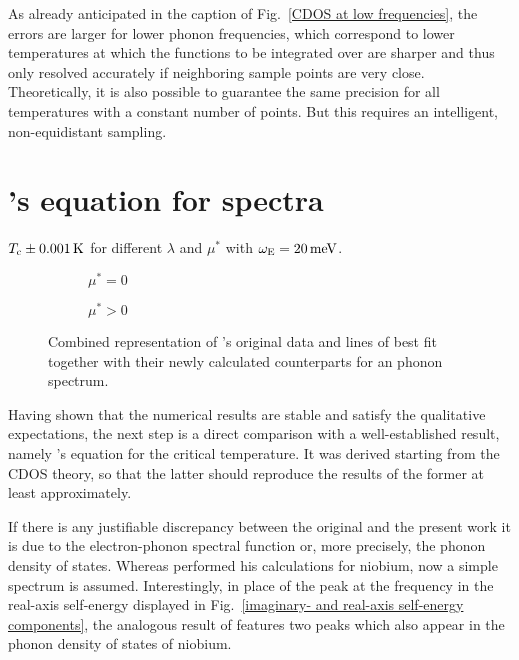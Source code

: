 As already anticipated in the caption of Fig.~\ref{CDOS at low frequencies}, the
errors are larger for lower phonon frequencies, which correspond to lower
temperatures at which the  functions to be integrated over are
sharper and thus only resolved accurately if neighboring sample points are very
close. Theoretically, it is also possible to guarantee the same precision for
all temperatures with a constant number of points. But this requires an
intelligent, non-equidistant sampling.

\section{'s equation for  spectra}

\begin{table}
    \centering
    
    \caption{
        $T \sb{\text{c}} \pm 0.001 \, \mathrm K$ for different $\lambda$ and $\mu^*$ with
        $\omega \sb{\text{E}} = 20 \, \mathrm{meV}$.}
    \label{Tc table}
\end{table}
%
\begin{figure}
    \small
    \begin{subfigure}{7cm}
        
        \caption{$\mu^* = 0$}
    \end{subfigure}%
    \begin{subfigure}{7cm}
        
        \caption{$\mu^* > 0$}
    \end{subfigure}
    \caption['s fits]{
        Combined representation of 's original data and lines of
        best fit together with their newly calculated counterparts for an
         phonon spectrum.}
    \label{McMillan's fits}
\end{figure}
%
Having shown that the numerical results are stable and satisfy the qualitative
expectations, the next step is a direct comparison with a well-established
result, namely 's equation for the critical temperature. It was
derived starting from the CDOS  theory, so that the latter
should reproduce the results of the former at least approximately.

If there is any justifiable discrepancy between the original and the present
work it is due to the electron-phonon spectral function or, more precisely, the
phonon density of states. Whereas  performed his calculations for
niobium, now a simple  spectrum is assumed. Interestingly, in
place of the peak at the  frequency in the real-axis self-energy
displayed in Fig.~\ref{imaginary- and real-axis self-energy components}, the
analogous result of  \cite[Fig.~4]{McMillan68} features two peaks
which also appear in the phonon density of states of niobium.

